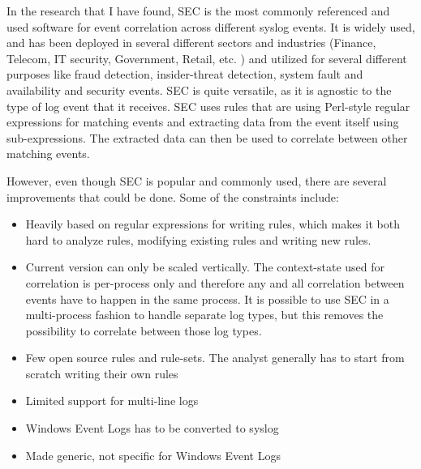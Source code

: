 In the research that I have found, SEC is the most commonly referenced and used software for event correlation across different syslog events. It is widely used, and has been deployed in several different sectors and industries (Finance, Telecom, IT security, Government, Retail, etc. \cite{vaarandi2005tools}) and utilized for several different purposes like fraud detection, insider-threat detection, system fault and availability and security events. SEC is quite versatile, as it is agnostic to the type of log event that it receives. SEC uses rules that are using Perl-style regular expressions for matching events and extracting data from the event itself using sub-expressions. The extracted data can then be used to correlate between other matching events.

However, even though SEC is popular and commonly used, there are several improvements that could be done. Some of the constraints include:
\begin{itemize}
    \item Heavily based on regular expressions for writing rules, which makes it both hard to analyze rules, modifying existing rules and writing new rules.
    \item Current version can only be scaled vertically. The context-state used for correlation is per-process only and therefore any and all correlation between events have to happen in the same process. It is possible to use SEC in a multi-process fashion to handle separate log types, but this removes the possibility to correlate between those log types. 
    \item Few open source rules and rule-sets. The analyst generally has to start from scratch writing their own rules
    \item Limited support for multi-line logs
    \item Windows Event Logs has to be converted to syslog
    \item Made generic, not specific for Windows Event Logs
\end{itemize}